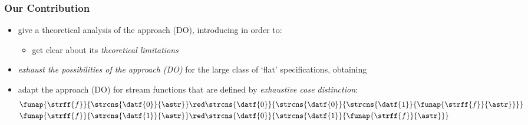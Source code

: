 \documentclass[10pt]{beamer}
\begin{document}
\begin{frame}%
  \frametitle{Our Contribution}

  \vspace*{\fill}

  \begin{itemize}
    \item give a theoretical analysis of the approach (DO), introducing
      in order to:
      \begin{itemize}
        \item get clear about its \emph{theoretical limitations}
      \end{itemize}
      \vspace*{\fill}
    \item \emph{exhaust the possibilities of the
      approach (DO)} for the large class of `flat' specifications,
      obtaining 
      \vspace*{\fill}
    \item adapt the approach (DO) for 
      stream functions that are defined by
      \emph{exhaustive case distinction}:
      \vspace*{-0.5ex}
      \begin{align*}
        \funap{\strff{f}}{\strcns{\datf{0}}{\astr}}
        &
        \red
        \strcns{\datf{0}}{\strcns{\datf{0}}{\strcns{\datf{1}}{\funap{\strff{f}}{\astr}}}}
        \\
        \funap{\strff{f}}{\strcns{\datf{1}}{\astr}}
        & \red 
        \strcns{\datf{0}}{\strcns{\datf{1}}{\funap{\strff{f}}{\astr}}}
      \end{align*}
      \vspace*{-5ex}
      \vspace*{\fill}
  \end{itemize}

  \vspace*{\fill}

\end{frame}%
\end{document}
